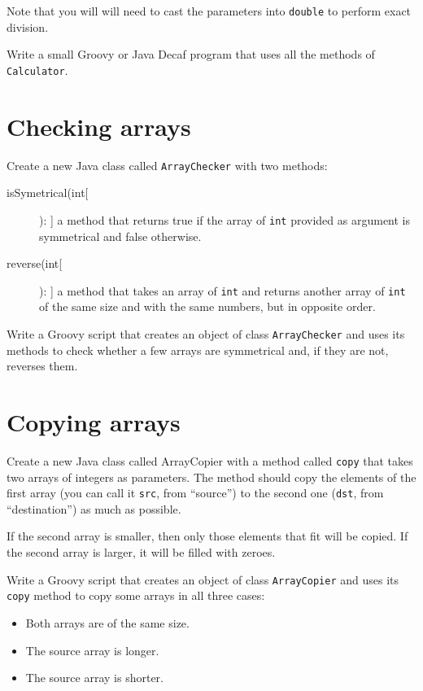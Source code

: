 \documentclass{article}
\begin{document}
Note that you will will need to cast the parameters into \verb+double+
to perform exact division. 

Write a small Groovy or Java Decaf program that uses all the methods of
\verb+Calculator+.

\section{Checking arrays}
\label{sec:checking-arrays}

Create a new Java class called \verb+ArrayChecker+ with two  methods: 

\begin{description}
\item[isSymetrical(int[]): ] a method that returns true if the array of
  \verb+int+ provided as argument is symmetrical and false otherwise.
\item[reverse(int[]): ] a method that takes an array of \verb+int+ and
  returns another array of \verb+int+ of the same size and with the
  same numbers, but in opposite order.
\end{description}

Write a Groovy script that
creates an object of class \verb+ArrayChecker+ and uses its methods
to check whether a few arrays are symmetrical and, if they are not,
reverses them. 

\section{Copying arrays}
\label{sec:copying-arrays}

Create a new Java class called ArrayCopier with a method called
\verb+copy+ that takes two arrays of integers as parameters. The
method should copy the elements of the first array (you can call it
\verb+src+, from ``source'') to the second one (\verb+dst+, from
``destination'') as much as possible.

If the second array is smaller, then only those elements that fit will
be copied. If the second array is larger, it will be filled with
zeroes. 

Write a Groovy script that
creates an object of class \verb+ArrayCopier+ and uses its \verb+copy+
method to copy some arrays in all three cases: 

\begin{itemize}
\item Both arrays are of the same size.
\item The source array is longer.
\item The source array is shorter. 
\end{itemize}
\end{document}
